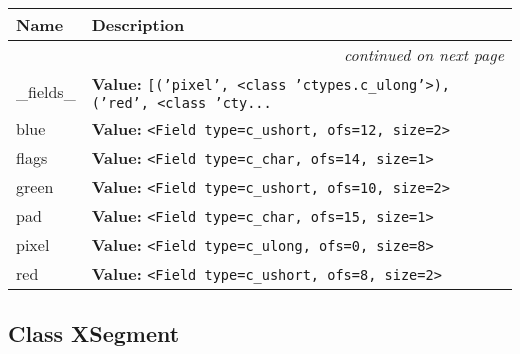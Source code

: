     \vspace{-1cm}
\hspace{\varindent}\begin{longtable}{|p{\varnamewidth}|p{\vardescrwidth}|l}
\cline{1-2}
\cline{1-2} \centering \textbf{Name} & \centering \textbf{Description}& \\
\cline{1-2}
\endhead\cline{1-2}\multicolumn{3}{r}{\small\textit{continued on next page}}\\\endfoot\cline{1-2}
\endlastfoot\raggedright \_\-f\-i\-e\-l\-d\-s\-\_\- & \raggedright \textbf{Value:} 
{\tt \texttt{[}\texttt{(}\texttt{'}\texttt{pixel}\texttt{'}\texttt{, }{\textless}class 'ctypes.c\_ulong'{\textgreater}\texttt{)}\texttt{, }\texttt{(}\texttt{'}\texttt{red}\texttt{'}\texttt{, }{\textless}class 'cty\texttt{...}}&\\
\cline{1-2}
\raggedright b\-l\-u\-e\- & \raggedright \textbf{Value:} 
{\tt {\textless}Field type=c\_ushort, ofs=12, size=2{\textgreater}}&\\
\cline{1-2}
\raggedright f\-l\-a\-g\-s\- & \raggedright \textbf{Value:} 
{\tt {\textless}Field type=c\_char, ofs=14, size=1{\textgreater}}&\\
\cline{1-2}
\raggedright g\-r\-e\-e\-n\- & \raggedright \textbf{Value:} 
{\tt {\textless}Field type=c\_ushort, ofs=10, size=2{\textgreater}}&\\
\cline{1-2}
\raggedright p\-a\-d\- & \raggedright \textbf{Value:} 
{\tt {\textless}Field type=c\_char, ofs=15, size=1{\textgreater}}&\\
\cline{1-2}
\raggedright p\-i\-x\-e\-l\- & \raggedright \textbf{Value:} 
{\tt {\textless}Field type=c\_ulong, ofs=0, size=8{\textgreater}}&\\
\cline{1-2}
\raggedright r\-e\-d\- & \raggedright \textbf{Value:} 
{\tt {\textless}Field type=c\_ushort, ofs=8, size=2{\textgreater}}&\\
\cline{1-2}
\end{longtable}



\subsection{Class XSegment}

